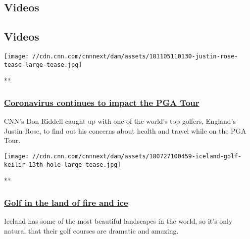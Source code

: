 \hypertarget{videos-}{%
\subsection{Videos~}\label{videos-}}

\hypertarget{videos}{%
\subsection{Videos}\label{videos}}

\href{/videos/sports/2020/06/25/sports-don-riddell-interviews-justin-rose-about-the-pga-tour-and-the-coronavirus-spt-intl.cnn}{}

\texttt{[image: //cdn.cnn.com/cnnnext/dam/assets/181105110130-justin-rose-tease-large-tease.jpg]}

**

\hypertarget{coronavirus-continues-to-impact-the-pga-tour-}{%
\subsubsection{\texorpdfstring{\href{/videos/sports/2020/06/25/sports-don-riddell-interviews-justin-rose-about-the-pga-tour-and-the-coronavirus-spt-intl.cnn}{Coronavirus
continues to impact the PGA Tour
}}{Coronavirus continues to impact the PGA Tour }}\label{coronavirus-continues-to-impact-the-pga-tour-}}

CNN's Don Riddell caught up with one of the world's top golfers,
England's Justin Rose, to find out his concerns about health and travel
while on the PGA Tour.

\href{/videos/sports/2018/07/26/iceland-golf-courses-reykjavik-vestmannaeyjar-living-golf-spt-intl.cnn}{}

\texttt{[image: //cdn.cnn.com/cnnnext/dam/assets/180727100459-iceland-golf-keilir-13th-hole-large-tease.jpg]}

**

\hypertarget{golf-in-the-land-of-fire-and-ice}{%
\subsubsection{\texorpdfstring{\href{/videos/sports/2018/07/26/iceland-golf-courses-reykjavik-vestmannaeyjar-living-golf-spt-intl.cnn}{Golf
in the land of fire and
ice}}{Golf in the land of fire and ice}}\label{golf-in-the-land-of-fire-and-ice}}

Iceland has some of the most beautiful landscapes in the world, so it's
only natural that their golf courses are dramatic and amazing.

